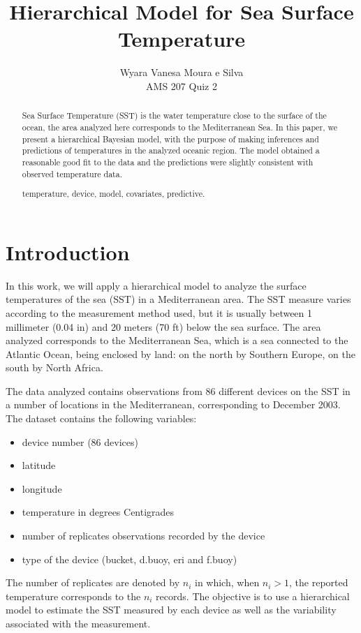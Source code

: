 \documentclass{asaproc}
\title{Hierarchical Model for Sea Surface Temperature}
\author{Wyara Vanesa Moura e Silva\\
AMS 207 Quiz 2\\}
\begin{document}
\maketitle


\begin{abstract}

Sea Surface Temperature (SST) is the water temperature close to the surface of the ocean, the area analyzed here corresponds to the Mediterranean Sea. In this paper, we present a hierarchical Bayesian model, with the purpose of making inferences and predictions of temperatures in the analyzed oceanic region. The model obtained a reasonable good fit to the data and the predictions were slightly consistent with observed temperature data.

\begin{keywords}
temperature, device, model, covariates, predictive. 
\end{keywords}
\end{abstract}

\section{Introduction}
In this work, we will apply a hierarchical model to analyze the surface temperatures of the sea (SST) in a Mediterranean area. The SST measure varies according to the measurement method used, but it is usually between 1 millimeter (0.04 in) and 20 meters (70 ft) below the sea surface. The area analyzed corresponds to the Mediterranean Sea, which is a sea connected to the Atlantic Ocean, being enclosed by land: on the north by Southern Europe, on the south by North Africa. 

The data analyzed contains observations from 86 different devices on the SST in a number of locations in the Mediterranean, corresponding to December 2003. The dataset contains the following variables:
\begin{itemize}
\item device number (86 devices)
\item latitude 
\item longitude
\item temperature in degrees Centigrades
\item number of replicates observations recorded by the device
\item type of the device (bucket, d.buoy, eri and f.buoy)
\end{itemize}

The number of replicates are denoted by $n_i$ in which, when $n_i > 1$, the reported temperature corresponds to the $n_i$ records. The objective is to use a hierarchical model to estimate the SST measured by each device as well as the variability associated with the measurement.
\end{document}
